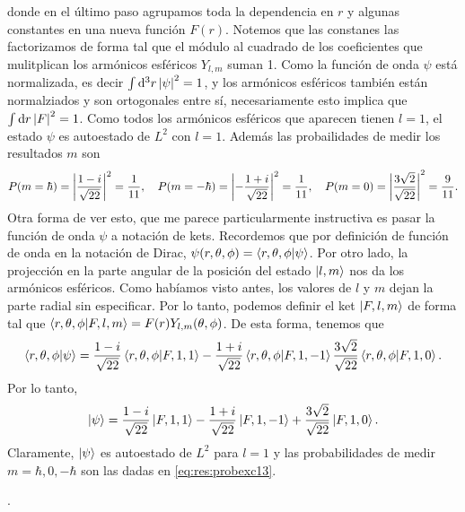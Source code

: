 \documentclass[10pt, a4paper]{article}
\newcommand{\Ylm}{Y_{l,m}}
\numberwithin{equation}{subsection}
\begin{document}
donde en el último paso agrupamos toda la dependencia en $r$ y algunas
constantes en una nueva función $F(r)$. Notemos que las constanes las
factorizamos de forma tal que el módulo al cuadrado de los coeficientes que
mulitplican los armónicos esféricos $\Ylm$ suman 1. Como la función de onda
$\psi$ está normalizada, es decir $\int\dd[3]{r}\abs{\psi}^2 = 1$, y los
armónicos esféricos también están normalziados y son ortogonales entre sí,
necesariamente esto implica que $\int\dd{r}\abs{F}^2 = 1$. Como todos los
armónicos esféricos que aparecen tienen $l =1$, el estado $\psi$ es autoestado
de $L^2$ con $l = 1$. Además las probailidades de medir los resultados $m$ son
\begin{equation} \label{eq:res:probexc13}
  P(m=\hbar) = \abs{\frac{1-i}{\sqrt{22}}}^2 = \frac{1}{11}, \quad
  P(m=-\hbar) = \abs{-\frac{1+i}{\sqrt{22}}}^2 = \frac{1}{11}, \quad
  P(m=0) = \abs{\frac{3\sqrt{2}}{\sqrt{22}}}^2 = \frac{9}{11}.
\end{equation}
Otra forma de ver esto, que me parece particularmente instructiva es pasar la
función de onda $\psi$ a notación de kets. Recordemos que por definición de
función de onda en la notación de Dirac, $\psi(r,\theta,\phi) =
\braket{r,\theta,\phi}{\psi}$. Por otro lado, la projección en la parte angular
de la posición del estado $\ket{l,m}$ nos da los armónicos esféricos. Como
habíamos visto antes, los valores de $l$ y $m$ dejan la parte radial sin
especificar. Por lo tanto, podemos definir el ket $\ket{F,l,m}$ de forma tal
que $\braket{r,\theta,\phi}{F,l,m} = F(r)\Ylm(\theta,\phi)$. De esta forma,
tenemos que
\begin{equation}
  \braket{r,\theta,\phi}{\psi} =
    \frac{1 - i}{\sqrt{22}}\braket{r,\theta,\phi}{F,1,1}
    -\frac{1 + i}{\sqrt{22}}\braket{r,\theta,\phi}{F,1,-1}
    \frac{3\sqrt{2}}{\sqrt{22}}\braket{r,\theta,\phi}{F,1,0}.
\end{equation}
Por lo tanto,
\begin{equation}
  \ket{\psi} =
    \frac{1 - i}{\sqrt{22}}\ket{F,1,1} -
    \frac{1 + i}{\sqrt{22}}\ket{F,1,-1} +
    \frac{3\sqrt{2}}{\sqrt{22}}\ket{F,1,0}.
\end{equation}
Claramente, $\ket{\psi}$ es autoestado de $L^2$ para $l = 1$ y las
probabilidades de medir $m = \hbar, 0, -\hbar$ son las dadas en
\eqref{eq:res:probexc13}.

\bigbreak
{}.
\bigbreak

\end{document}
